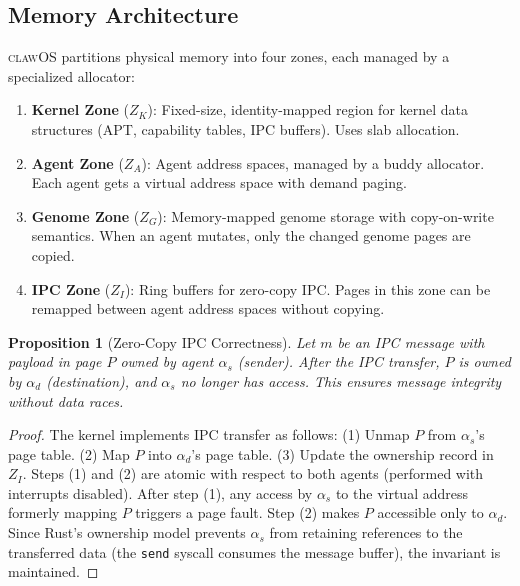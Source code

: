 \documentclass{article}
\newtheorem{proposition}[theorem]{Proposition}
\newcommand{\clawos}{\textsc{clawOS}}
\begin{document}
\subsection{Memory Architecture}

\clawos{} partitions physical memory into four zones, each managed by a specialized allocator:

\begin{enumerate}[leftmargin=*]
    \item \textbf{Kernel Zone} ($Z_K$): Fixed-size, identity-mapped region for kernel data structures (APT, capability tables, IPC buffers). Uses slab allocation.
    \item \textbf{Agent Zone} ($Z_A$): Agent address spaces, managed by a buddy allocator. Each agent gets a virtual address space with demand paging.
    \item \textbf{Genome Zone} ($Z_G$): Memory-mapped genome storage with copy-on-write semantics. When an agent mutates, only the changed genome pages are copied.
    \item \textbf{IPC Zone} ($Z_I$): Ring buffers for zero-copy IPC. Pages in this zone can be remapped between agent address spaces without copying.
\end{enumerate}

\begin{proposition}[Zero-Copy IPC Correctness]
\label{prop:zerocopy}
Let $m$ be an IPC message with payload in page $P$ owned by agent $\alpha_s$ (sender). After the IPC transfer, $P$ is owned by $\alpha_d$ (destination), and $\alpha_s$ no longer has access. This ensures message integrity without data races.
\end{proposition}

\begin{proof}
The kernel implements IPC transfer as follows: (1) Unmap $P$ from $\alpha_s$'s page table. (2) Map $P$ into $\alpha_d$'s page table. (3) Update the ownership record in $Z_I$. Steps (1) and (2) are atomic with respect to both agents (performed with interrupts disabled). After step (1), any access by $\alpha_s$ to the virtual address formerly mapping $P$ triggers a page fault. Step (2) makes $P$ accessible only to $\alpha_d$. Since Rust's ownership model prevents $\alpha_s$ from retaining references to the transferred data (the \texttt{send} syscall consumes the message buffer), the invariant is maintained.
\end{proof}

%
%
\end{document}

